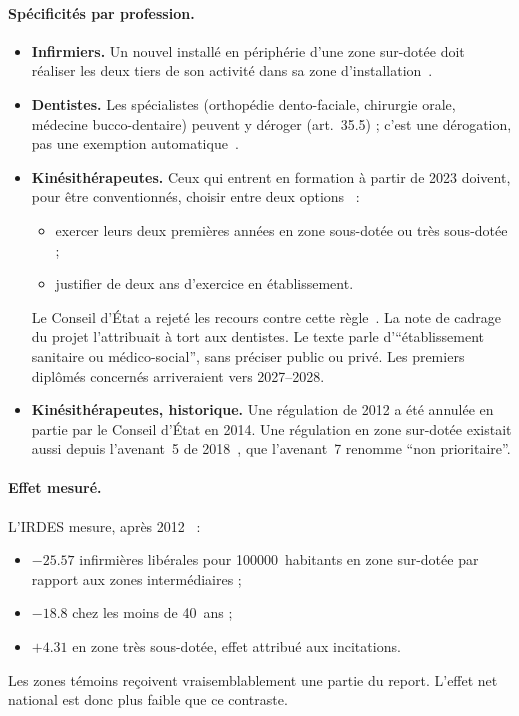 \documentclass[11pt]{article}
\begin{document}
\paragraph{Spécificités par profession.}
\begin{itemize}
\item \textbf{Infirmiers.} Un nouvel installé en périphérie d'une zone
  sur-dotée doit réaliser les deux tiers de son activité dans sa zone
  d'installation~\cite{avenant6ide}.
\item \textbf{Dentistes.} Les spécialistes (orthopédie dento-faciale,
  chirurgie orale, médecine bucco-dentaire) peuvent y déroger (art.~35.5) ; c'est une dérogation, pas une exemption automatique~\cite{conventioncd2023}.
\item \textbf{Kinésithérapeutes.} Ceux qui entrent en formation à partir
  de 2023 doivent, pour être conventionnés, choisir entre deux options~\cite{avenant7mk} :
  \begin{itemize}
  \item exercer leurs deux premières années en zone sous-dotée ou très
    sous-dotée ;
  \item justifier de deux ans d'exercice en établissement.
  \end{itemize}
  Le Conseil d'État a rejeté les recours contre cette règle~\cite{ce488665}.
  La note de cadrage du projet l'attribuait à tort aux dentistes. Le texte
  parle d'\enquote{établissement sanitaire ou médico-social}, sans préciser
  public ou privé. Les premiers diplômés concernés arriveraient vers
  2027--2028\derive.
\item \textbf{Kinésithérapeutes, historique.} Une régulation de 2012 a été
  annulée en partie par le Conseil d'État en 2014. Une régulation en zone
  sur-dotée existait aussi depuis l'avenant~5 de 2018~\cite{ccomptes2024},
  que l'avenant~7 renomme \enquote{non prioritaire}.
\end{itemize}

\paragraph{Effet mesuré.}
L'IRDES mesure, après 2012~\cite{irdes270} :
\begin{itemize}
\item $\num{-25.57}$ infirmières libérales pour \num{100000}~habitants en
  zone sur-dotée par rapport aux zones intermédiaires ;
\item $\num{-18.8}$ chez les moins de 40~ans ;
\item $+\num{4.31}$ en zone très sous-dotée, effet attribué aux
  incitations.
\end{itemize}
Les zones témoins reçoivent vraisemblablement une partie du report. L'effet
net national est donc plus faible que ce contraste.
\end{document}
